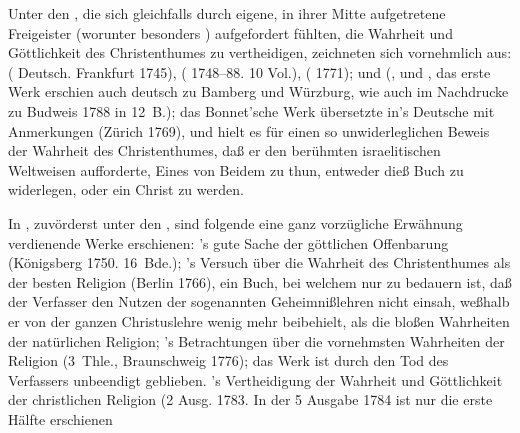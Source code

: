 \begin{aufza}
\begin{aufzb}
\item{} Unter den , die sich gleichfalls durch eigene, in ihrer Mitte aufgetretene Freigeister (worunter besonders ) aufgefordert fühlten, die Wahrheit und Göttlichkeit des Christenthumes zu vertheidigen, zeichneten sich vornehmlich aus:  ( Deutsch. Frankfurt 1745),  ( 1748--88. 10 Vol.),  ( 1771); und  (, und , das erste Werk erschien auch deutsch zu Bamberg und Würzburg, wie auch im Nachdrucke zu Budweis 1788 in 12~B.); das Bonnet'sche Werk übersetzte  in's Deutsche mit Anmerkungen (Zürich 1769), und hielt es für einen so unwiderleglichen Beweis der Wahrheit des Christenthumes, daß er den berühmten israelitischen Weltweisen  aufforderte, Eines von Beidem zu thun, entweder dieß Buch zu widerlegen, oder ein Christ zu werden.
\item In , zuvörderst unter den , sind folgende eine ganz vorzügliche Erwähnung verdienende Werke erschienen: 's gute Sache der göttlichen Offenbarung (Königsberg 1750. 16~Bde.); 's Versuch über die Wahrheit des Christenthumes als der besten Religion 
(Berlin 1766), ein Buch, bei welchem nur zu bedauern ist, daß der Verfasser den Nutzen der sogenannten Geheimnißlehren nicht einsah, weßhalb er von der ganzen Christuslehre wenig mehr beibehielt, als die bloßen Wahrheiten der natürlichen Religion; 's Betrachtungen über die vornehmsten Wahrheiten der Religion (3~Thle., Braunschweig 1776); das Werk ist durch den Tod des Verfassers unbeendigt geblieben. 's Vertheidigung der Wahrheit und Göttlichkeit der christlichen Religion (2 Ausg. 1783. In der 5 Ausgabe 1784 ist nur die erste Hälfte erschienen\editorischeanmerkung{%
}
\end{aufzb}
\end{aufza}
